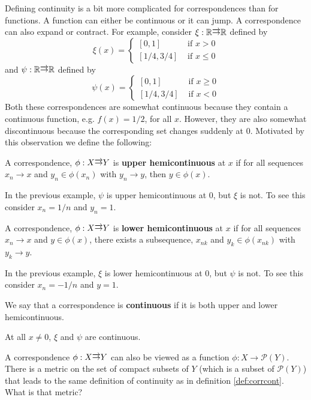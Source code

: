 Defining continuity is a bit more complicated for correspondences than
for functions. A function can either be continuous or it can jump. A
correspondence can also expand or contract. For example, consider
$\xi:\mathbb{R} \overrightarrow{\rightarrow} \mathbb{R}$ defined by 
\[ \xi(x) = \begin{cases} 
  [0,1] & \text{ if } x > 0 \\
  [1/4,3/4] & \text{ if } x \leq 0 
\end{cases} \]
and $\psi: \mathbb{R} \overrightarrow{\rightarrow} \mathbb{R}$ defined by
\[ \psi(x) = \begin{cases} 
  [0,1] & \text{ if } x \geq 0 \\
  [1/4,3/4] & \text{ if } x < 0 
\end{cases} \]
Both these correspondences are somewhat continuous because they
contain a continuous function, e.g. $f(x) = 1/2$,  for all
$x$. However, they are also somewhat discontinuous because the
corresponding set changes suddenly at $0$. Motivated by this
observation we define the following:
\begin{definition}
  A correspondence, $\phi: X \overrightarrow{\rightarrow} Y$ is \textbf{upper
    hemicontinuous} at $x$ if for all sequences $x_n \to x$ and $y_n
  \in \phi(x_n)$ with $y_n \to y$, then $y \in \phi(x)$.
\end{definition}
In the previous example, $\psi$ is upper hemicontinuous at $0$, but
$\xi$ is not. To see this consider $x_n = 1/n$ and $y_n = 1$.
\begin{definition}
  A correspondence, $\phi: X \overrightarrow{\rightarrow} Y$ is \textbf{lower
    hemicontinuous} at $x$ if for all sequences $x_n \to x$ and $y \in
  \phi(x)$, there exists a subsequence, $x_{nk}$ and $y_k \in
  \phi(x_{nk})$ with $y_k \to y$.
\end{definition}
In the previous example, $\xi$ is lower hemicontinuous at $0$, but
$\psi$ is not. To see this consider $x_n = -1/n$ and $y = 1$. 
\begin{definition}\label{def:corrcont}
  We say that a correspondence is \textbf{continuous} if it is both
  upper and lower hemicontinuous.
\end{definition}
At all $x \neq 0$, $\xi$ and $\psi$ are continuous.

\begin{exercise}
  A correspondence $\phi:X \overrightarrow{\rightarrow} Y$ can also be viewed as a function
  $\phi:X \to \mathcal{P}(Y)$. There is a metric on the set of compact
  subsets of $Y$ (which is a subset of $\mathcal{P}(Y)$) that leads to
  the same definition of continuity as in definition
  \ref{def:corrcont}. What is that metric?
\end{exercise}





